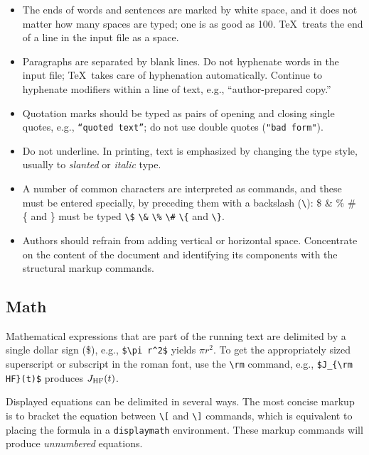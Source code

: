\begin{itemize}
\item The ends of words and sentences are marked by white space, and
it does not matter how many spaces are typed; one is as good as 100.
\TeX\ treats the end of a line in the input file as a space.

\item Paragraphs are separated by blank lines.
Do not hyphenate words in the input file;
\TeX\ takes care of hyphenation automatically.
Continue to hyphenate modifiers within a line of text, e.g.,
``author-prepared copy.''

\item Quotation marks should be typed as pairs of opening and
closing single quotes, e.g., {\tt ``quoted text''};
do not use double quotes ({\tt "bad form"}).

\item Do not underline.
In printing, text is emphasized by changing the type style,
usually to {\sl slanted\/} or {\it italic\/} type.

\item A number of common characters are interpreted as commands,
and these must be entered specially, by preceding them with
a backslash (\verb"\"): \$ \& \% \# \{ and \} must be typed
\verb"\$" \verb"\&" \verb"\%" \verb"\#" \verb"\{" and \verb"\}".

\item Authors should refrain from adding vertical or horizontal space.
Concentrate on the content of the document and identifying its
components with the structural markup commands.

\end{itemize}


\subsection{Math}

Mathematical expressions that are part of the running text are
delimited by a single dollar sign (\$),
e.g., \verb"$\pi r^2$" yields $\pi r^2$.
To get the appropriately sized superscript or subscript in the
roman font, use the \verb"\rm" command, e.g., 
\verb"$J_{\rm HF}(t)$" produces $J_{\rm HF}(t)$.

Displayed equations can be delimited in several ways.
The most concise markup is to bracket the equation between
\verb"\[" and \verb"\]" commands,
which is equivalent to placing the formula in a {\tt displaymath}
environment.  These markup commands will produce
{\sl unnumbered} equations.

